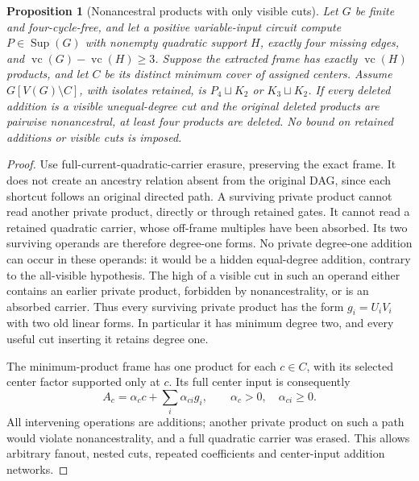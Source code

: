 \documentclass[11pt]{article}
\newcommand{\Sup}{\operatorname{Sup}}
\newcommand{\vc}{\operatorname{vc}}
\newtheorem{proposition}[theorem]{Proposition}
\theoremstyle{definition}
\theoremstyle{remark}
\begin{document}
\begin{proposition}[Nonancestral products with only visible cuts]\label{prop:nonancestralexceptional}
Let $G$ be finite and four-cycle-free, and let a positive variable-input circuit compute $P\in\Sup(G)$ with nonempty quadratic support $H$, exactly four missing edges, and $\vc(G)-\vc(H)\ge3$. Suppose the extracted frame has exactly $\vc(H)$ products, and let $C$ be its distinct minimum cover of assigned centers. Assume $G[V(G)\setminus C]$, with isolates retained, is $P_4\sqcup K_2$ or $K_3\sqcup K_2$. If every deleted addition is a visible unequal-degree cut and the original deleted products are pairwise nonancestral, at least four products are deleted. No bound on retained additions or visible cuts is imposed.
\end{proposition}
\begin{proof}
Use full-current-quadratic-carrier erasure, preserving the exact frame. It does not create an ancestry relation absent from the original DAG, since each shortcut follows an original directed path. A surviving private product cannot read another private product, directly or through retained gates. It cannot read a retained quadratic carrier, whose off-frame multiples have been absorbed. Its two surviving operands are therefore degree-one forms. No private degree-one addition can occur in these operands: it would be a hidden equal-degree addition, contrary to the all-visible hypothesis. The high of a visible cut in such an operand either contains an earlier private product, forbidden by nonancestrality, or is an absorbed carrier. Thus every surviving private product has the form $g_i=U_iV_i$ with two old linear forms. In particular it has minimum degree two, and every useful cut inserting it retains degree one.

The minimum-product frame has one product for each $c\in C$, with its selected center factor supported only at $c$. Its full center input is consequently
\[
 A_c=\alpha_c c+\sum_i\alpha_{ci}g_i,
 \qquad \alpha_c>0,\quad\alpha_{ci}\ge0.
\]
All intervening operations are additions; another private product on such a path would violate nonancestrality, and a full quadratic carrier was erased. This allows arbitrary fanout, nested cuts, repeated coefficients and center-input addition networks.


\end{proof}
\end{document}
